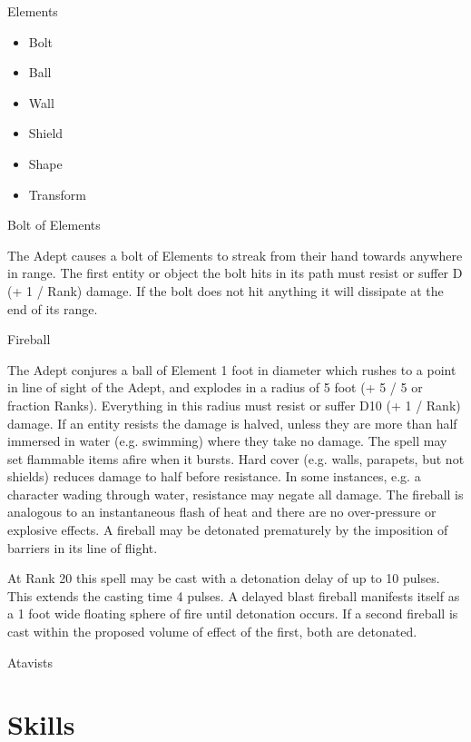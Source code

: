 \documentclass{report}
\begin{document}
\begin{College}{Elements}
\begin{itemize}
\item Bolt
\item Ball
\item Wall
\item Shield
\item Shape
\item Transform
\end{itemize}

\begin{spell}[G-1]{Bolt of Elements}
\begin{effects}
The Adept causes a bolt of Elements to streak from their hand towards
anywhere in range.  The first entity or object the bolt hits in its
path must resist or suffer D (+ 1 / Rank) damage.  If the bolt does
not hit anything it will dissipate at the end of its range.
\end{effects}
\end{spell}

\begin{spell}[S-4]{Fireball}

\begin{effects}
The Adept conjures a ball of Element 1 foot in diameter which rushes
to a point in line of sight of the Adept, and explodes in a radius of
5 foot (+ 5 / 5 or fraction Ranks). Everything in this radius must
resist or suffer D10 (+ 1 / Rank) damage.  If an entity resists the
damage is halved, unless they are more than half immersed in water
(e.g. swimming) where they take no damage.  The spell may set
flammable items afire when it bursts.  Hard cover (e.g. walls,
parapets, but not shields) reduces damage to half before resistance.
In some instances, e.g. a character wading through water, resistance
may negate all damage. The fireball is analogous to an instantaneous
flash of heat and there are no over-pressure or explosive effects.  A
fireball may be detonated prematurely by the imposition of barriers in
its line of flight.

At Rank 20 this spell may be cast with a detonation delay of up to 10
pulses.  This extends the casting time 4 pulses.  A delayed blast
fireball manifests itself as a 1 foot wide floating sphere of fire
until detonation occurs. If a second fireball is cast within the
proposed volume of effect of the first, both are detonated.
\end{effects}
\end{spell}



\end{College}

\begin{College}{Atavists}
\end{College}

\chapter{Skills}
\end{document}
